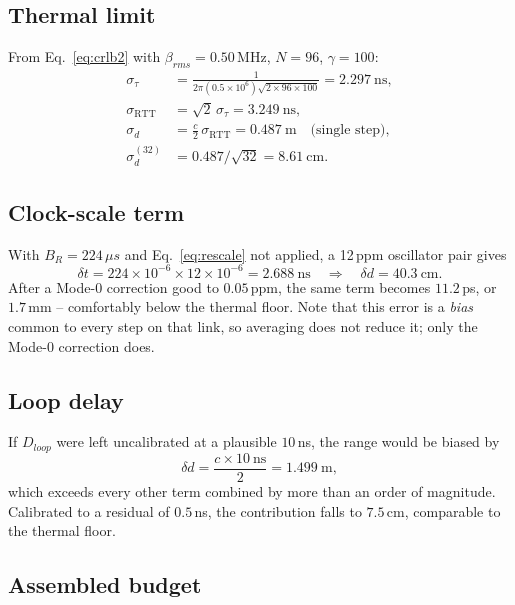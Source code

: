 \documentclass[11pt,a4paper]{article}
\newcommand{\us}{\,\ensuremath{\upmu}s}
\newcommand{\RTT}{\mathrm{RTT}}
\providecommand{\upmu}{\mu}
\begin{document}
\subsection{Thermal limit}

From Eq.~\eqref{eq:crlb2} with $\beta_{rms} = 0.50$\,MHz, $N = 96$, $\gamma = 100$:
\begin{align}
\sigma_\tau     &= \frac{1}{2\pi (0.5\times10^{6})\sqrt{2 \times 96 \times 100}} = 2.297\ \text{ns},\\
\sigma_{\RTT}   &= \sqrt{2}\,\sigma_\tau = 3.249\ \text{ns}, \\
\sigma_d        &= \tfrac{c}{2}\,\sigma_{\RTT} = 0.487\ \text{m} \quad\text{(single step)}, \\
\sigma_d^{(32)} &= 0.487/\sqrt{32} = 8.61\ \text{cm}.
\end{align}

\subsection{Clock-scale term}

With $B_R = 224\us$ and Eq.~\eqref{eq:rescale} not applied, a 12\,ppm oscillator pair gives
\begin{equation}
\delta t = 224\times10^{-6}\times 12\times10^{-6} = 2.688\ \text{ns}
\quad\Rightarrow\quad
\delta d = 40.3\ \text{cm}.
\end{equation}
After a Mode-0 correction good to $0.05$\,ppm, the same term becomes $11.2$\,ps, or $1.7$\,mm --
comfortably below the thermal floor. Note that this error is a \emph{bias} common to every step on
that link, so averaging does not reduce it; only the Mode-0 correction does.

\subsection{Loop delay}

If $D_{loop}$ were left uncalibrated at a plausible $10$\,ns, the range would be biased by
\begin{equation}
\delta d = \frac{c \times 10\ \text{ns}}{2} = 1.499\ \text{m},
\end{equation}
which exceeds every other term combined by more than an order of magnitude. Calibrated to a residual
of $0.5$\,ns, the contribution falls to $7.5$\,cm, comparable to the thermal floor.

\subsection{Assembled budget}
\end{document}
